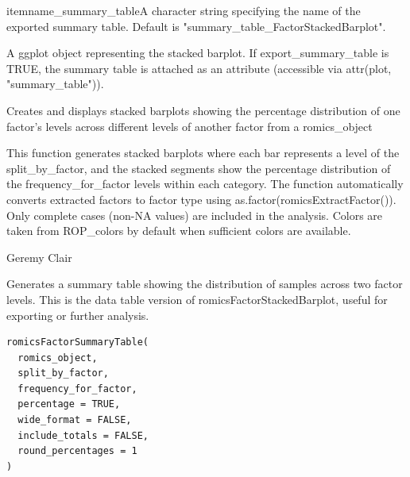 \documentclass[a4paper]{book}
\begin{document}
\begin{Arguments}
\begin{ldescription}
\bsl{}itemname\_summary\_tableA character string specifying the name of the exported summary table. Default is "summary\_table\_FactorStackedBarplot".

\end{ldescription}

A ggplot object representing the stacked barplot. If export\_summary\_table is TRUE, the summary table is attached as an attribute (accessible via attr(plot, "summary\_table")).


Creates and displays stacked barplots showing the percentage distribution of one factor's levels across different levels of another factor from a romics\_object


This function generates stacked barplots where each bar represents a level of the split\_by\_factor, and the stacked segments show the percentage distribution of the frequency\_for\_factor levels within each category. The function automatically converts extracted factors to factor type using as.factor(romicsExtractFactor()). Only complete cases (non-NA values) are included in the analysis. Colors are taken from ROP\_colors by default when sufficient colors are available.


Geremy Clair

\end{Arguments}
%
\begin{Description}
Generates a summary table showing the distribution of samples across two factor levels.
This is the data table version of romicsFactorStackedBarplot, useful for exporting or further analysis.
\end{Description}
%
\begin{Usage}
\begin{verbatim}
romicsFactorSummaryTable(
  romics_object,
  split_by_factor,
  frequency_for_factor,
  percentage = TRUE,
  wide_format = FALSE,
  include_totals = FALSE,
  round_percentages = 1
)
\end{verbatim}
\end{Usage}
%
\end{document}
